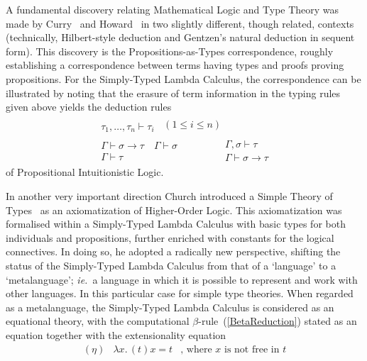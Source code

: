 \documentclass[11pt,twocolumn]{article}
\newcommand{\ie}{\emph{ie.}}
\begin{document}
A fundamental discovery relating Mathematical Logic and Type Theory was made
by Curry~\cite{Curry1934} and Howard~\cite{Howard1969}
in two slightly different, though re\-lat\-ed, 
contexts (technically, Hilbert-style deduction %
and Gentzen's natural deduction in sequent form). %
This discovery is the 
Propositions-as-Types correspondence, %
roughly establishing a correspondence between terms having types and proofs
proving propositions.  For the Simply-Typed Lambda Calculus, the correspondence
can be illustrated by noting that the erasure of term information in the typing 
rules given above yields the deduction rules
\[\begin{array}{c}
  \begin{array}{c}
    \\ \hline
    \tau_1,\ldots,\tau_n\vdash \tau_i
  \end{array}
  \enspace(1\leq i\leq n)
  \\[4mm]
  \begin{array}{c}
    \Gamma\vdash \sigma\to\tau
    \quad 
    \Gamma\vdash\sigma 
    \\ \hline
    \Gamma\vdash\tau
  \end{array}
  \qquad\qquad
  \begin{array}{c}
    \Gamma,\sigma\vdash\tau
    \\ \hline
    \Gamma\vdash\sigma\to\tau
  \end{array}
\end{array}
\]
of Propositional Intuitionistic %
Logic. %

In another very important direction Church introduced a Simple Theory of
Types~\cite{Church1940} as an axiomatization of Higher-Order Logic.
This axiomatization was formalised within a Simply-Typed Lambda Calculus with basic types
for both individuals and propositions, further enriched with constants for the logical
connectives.  In doing so, he adopted a radically new perspective,
shifting the status of the Simply-Typed Lambda Calculus from that of 
a `language' to a `metalanguage'; \ie~a language in which it is
possible to represent and work with other languages. In this particular case
for simple type theories.  When regarded as a metalanguage, the Simply-Typed
Lambda Calculus is considered as an equational theory, with the
computational \mbox{$\beta$-rule}~(\ref{BetaReduction}) stated as an
equation together with the extensionality equation
  \[\begin{array}{rll}
(\eta) & \lambda x.\,(t)x = t 
& \mbox{, where $x$ is not free in $t$}
  \end{array}\]
\vspace*{-4mm}
\end{document}
